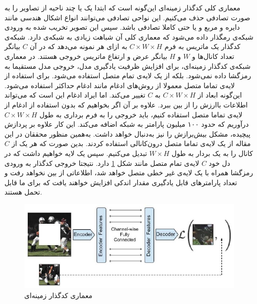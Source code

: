 معماری کلی کدگذار زمینه‌ای این‌گونه است که ابتدا یک یا چند ناحیه از تصاویر را به صورت تصادفی حذف می‌کنیم. این نواحی تصادفی می‌توانند انواع اشکال هندسی مانند دایره و مربع و یا حتی کاملا تصادفی باشد. سپس این تصویر تخریب شده به ورودی شبکه‌ی رمگذار داده می‌شود که معماری کلی آن شباهت زیادی به شبکه‌ی
دارد. شبکه‌ی کدگذار یک ماتریس به فرم
$C \times W \times H$
به ازای هر نمونه می‌دهد که در آن $C$ بیانگر تعداد کانال‌ها و $W$ و $H$ بیانگر عرض و ارتفاع ماتریس خروجی هستند. در معماری شبکه‌ی کدگذار زمینه‌ای، برای افزایش ظرفیت یادگیری مدل، خروجی مدل مستقیما به رمزگشا داده نمی‌شود. بلکه از یک لایه‌ی تمام متصل استفاده می‌شود. برای استفاده از لایه‌ی تماما متصل معمولا از
روش‌های ادغام
مانند ادغام حداکثر استفاده می‌شود. این‌گونه ابعاد از
$C \times W \times H$
به $C$ تغییر می‌کند.
اما ایراد ادغام این است که می‌تواند اطلاعات باارزش را از بین ببرد. علاوه بر آن اگر بخواهیم که بدون استفاده از ادغام از لایه‌ی تماما متصل استفاده کنیم، باید خروجی را به فرم برداری به طول
$C \times W \times H$
درآوریم که حدود ۱۰۰ میلیون پارامتر به شبکه اضافه می‌کند. این کار علاوه بر پردازش پیچیده، مشکل بیش‌برازش را نیز به‌دنبال خواهد داشت. به‌همین منظور محققان در این مقاله از یک لایه‌ی
تماما متصل درون‌کانالی
استفاده کردند. بدین صورت که هر یک از
$C$
کانال را به یک بردار به طول
$W \times H$
تبدیل می‌کنیم. سپس یک لایه خواهیم داشت که در دل خود
$C$
لایه‌ی تمام متصل مانند شکل \ref{fig:inpainting-architecture} دارد.
نتیجتا خروجی کدگذار به ورودی رمزگشا همراه با یک لایه‌ی غیر خطی متصل خواهد شد، اطلاعاتی از بین نخواهد رفت و تعداد پارامترهای قابل یادگیری مقدار اندکی افزایش خواهند یافت که برای ما قابل تحمل هستند.

\begin{figure}[htb!]
\centering
\includegraphics[width=1.0\textwidth]{Images/Chapter2/inpainting-architecture.png}
\caption{معماری کدگذار زمینه‌ای}
\label{fig:inpainting-architecture}
\end{figure}

